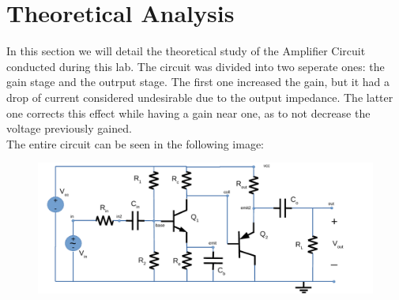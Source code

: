 \section{Theoretical Analysis}
\label{sec:analysis}

In this section we will detail the theoretical study of the Amplifier Circuit conducted during this lab. The circuit was divided into two seperate ones: the gain stage and the outrput stage. The first one increased the gain, but it had a drop of current considered undesirable due to the output impedance. The latter one corrects this effect while having a gain near one, as to not decrease the voltage previously gained.\\
The entire circuit can be seen in the following image:\\


\FloatBarrier
\begin{figure}
  \includegraphics[scale=0.7]{circuit.pdf}
  \caption{}
  \label{}
\end{figure}
\FloatBarrier

